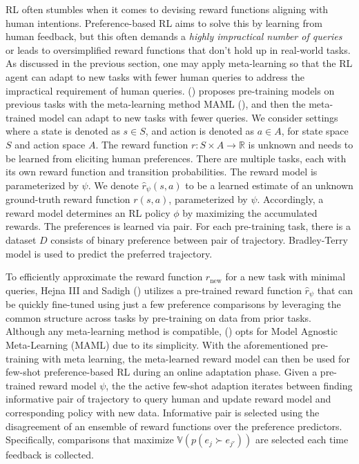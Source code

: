 \documentclass[
  letterpaper,
  numbers=noenddot,
  DIV=11]{scrreprt}
\theoremstyle{plain}
\theoremstyle{definition}
\theoremstyle{plain}
\theoremstyle{remark}
\begin{document}
RL often stumbles when it comes to devising reward functions aligning
with human intentions. Preference-based RL aims to solve this by
learning from human feedback, but this often demands a \emph{highly
impractical number of queries} or leads to oversimplified reward
functions that don't hold up in real-world tasks. As discussed in the
previous section, one may apply meta-learning so that the RL agent can
adapt to new tasks with fewer human queries to address the impractical
requirement of human queries. () proposes pre-training models on previous tasks with the
meta-learning method MAML (), and then the meta-trained model can adapt to new
tasks with fewer queries. We consider settings where a state is denoted
as \(s\in S\), and action is denoted as \(a\in A\), for state space
\(S\) and action space \(A\). The reward function
\(r: S\times A \to \mathbb{R}\) is unknown and needs to be learned from
eliciting human preferences. There are multiple tasks, each with its own
reward function and transition probabilities. The reward model is
parameterized by \(\psi\). We denote \(\hat{r}_\psi(s, a)\) to be a
learned estimate of an unknown ground-truth reward function \(r(s, a)\),
parameterized by \(\psi\). Accordingly, a reward model determines an RL
policy \(\phi\) by maximizing the accumulated rewards. The preferences
is learned via pair. For each pre-training task, there is a dataset
\(D\) consists of binary preference between pair of trajectory.
Bradley-Terry model is used to predict the preferred trajectory.

To efficiently approximate the reward function \(r_\text{new}\) for a
new task with minimal queries, Hejna III and Sadigh
() utilizes a pre-trained reward
function \(\hat{r}_\psi\) that can be quickly fine-tuned using just a
few preference comparisons by leveraging the common structure across
tasks by pre-training on data from prior tasks. Although any
meta-learning method is compatible, () opts for Model Agnostic Meta-Learning (MAML) due
to its simplicity. With the aforementioned pre-training with meta
learning, the meta-learned reward model can then be used for few-shot
preference-based RL during an online adaptation phase. Given a
pre-trained reward model \(\psi\), the the active few-shot adaption
iterates between finding informative pair of trajectory to query human
and update reward model and corresponding policy with new data.
Informative pair is selected using the disagreement of an ensemble of
reward functions over the preference predictors. Specifically,
comparisons that maximize \(\mathbb{V}(p(e_j \succ e_{j'}))\) are
selected each time feedback is collected.
\end{document}
